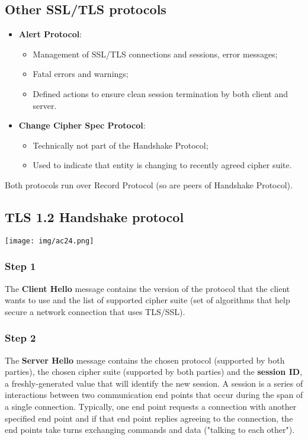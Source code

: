 \documentclass[a4paper, 10pt, titlepage]{article}
\begin{document}
\subsection{Other SSL/TLS protocols}
\begin{itemize}
\item \textbf{Alert Protocol}:
\begin{itemize}
\item Management of SSL/TLS connections and sessions, error messages;
\item Fatal errors and warnings;
\item Defined actions to ensure clean session termination by both client and server.
\end{itemize}
\item \textbf{Change Cipher Spec Protocol}:
\begin{itemize}
\item Technically not part of the Handshake Protocol;
\item Used to indicate that entity is changing to recently agreed cipher suite.
\end{itemize}
\end{itemize}
Both protocols run over Record Protocol (so are peers of Handshake Protocol).

\subsection{TLS 1.2 Handshake protocol}
\begin{minipage}{0.4\textwidth}
\texttt{[image: img/ac24.png]}
\end{minipage}
\hfill
\begin{minipage}{0.5\textwidth}
\subsubsection*{Step 1}
The \textbf{Client Hello} message contains the version of the protocol that the client wants to use and the list of supported cipher suite (set of algorithms that help secure a network connection that uses TLS/SSL).
\subsubsection*{Step 2}
The \textbf{Server Hello} message contains the chosen protocol (supported by both parties), the chosen cipher suite (supported by both parties) and the \textbf{session ID}, a freshly-generated value that will identify the new session. A session is a series of interactions between two communication end points that occur during the span of a single connection. Typically, one end point requests a connection with another specified end point and if that end point replies agreeing to the connection, the end points take turns exchanging commands and data ("talking to each other"). 
\end{minipage}
\end{document}
